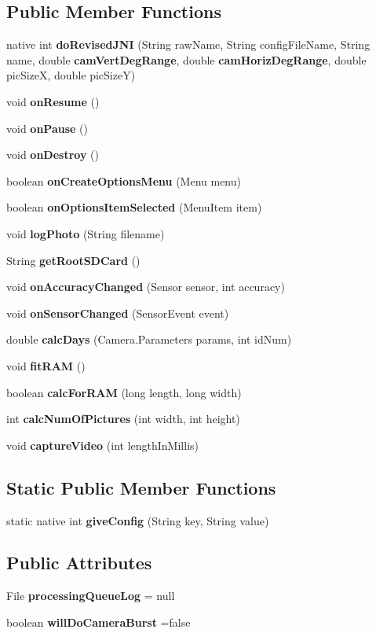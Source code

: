 \subsection*{Public Member Functions}
\begin{DoxyCompactItemize}
\item 
native int {\bf do\+Revised\+J\+N\+I} (String raw\+Name, String config\+File\+Name, String name, double {\bf cam\+Vert\+Deg\+Range}, double {\bf cam\+Horiz\+Deg\+Range}, double pic\+Size\+X, double pic\+Size\+Y)
\item 
void {\bf on\+Resume} ()
\item 
void {\bf on\+Pause} ()
\item 
void {\bf on\+Destroy} ()
\item 
boolean {\bf on\+Create\+Options\+Menu} (Menu menu)
\item 
boolean {\bf on\+Options\+Item\+Selected} (Menu\+Item item)
\item 
void {\bf log\+Photo} (String filename)
\item 
String {\bf get\+Root\+S\+D\+Card} ()
\item 
void {\bf on\+Accuracy\+Changed} (Sensor sensor, int accuracy)
\item 
void {\bf on\+Sensor\+Changed} (Sensor\+Event event)
\item 
double {\bf calc\+Days} (Camera.\+Parameters params, int id\+Num)
\item 
void {\bf fit\+R\+A\+M} ()
\item 
boolean {\bf calc\+For\+R\+A\+M} (long length, long width)
\item 
int {\bf calc\+Num\+Of\+Pictures} (int width, int height)
\item 
void {\bf capture\+Video} (int length\+In\+Millis)
\end{DoxyCompactItemize}
\subsection*{Static Public Member Functions}
\begin{DoxyCompactItemize}
\item 
static native int {\bf give\+Config} (String key, String value)
\end{DoxyCompactItemize}
\subsection*{Public Attributes}
\begin{DoxyCompactItemize}
\item 
File {\bf processing\+Queue\+Log} = null
\item 
boolean {\bf will\+Do\+Camera\+Burst} =false
\end{DoxyCompactItemize}
